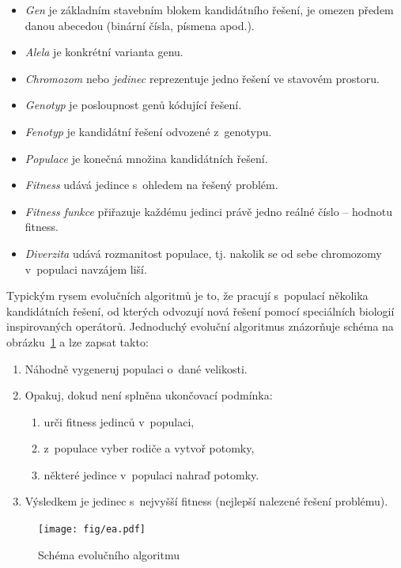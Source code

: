 \begin{itemize}
    \item\emph{Gen} je základním stavebním blokem kandidátního řešení, je omezen předem danou abecedou (binární čísla, písmena apod.).
    \item\emph{Alela} je konkrétní varianta genu.
    \item\emph{Chromozom} nebo \emph{jedinec} reprezentuje jedno řešení ve stavovém prostoru.
    \item\emph{Genotyp} je posloupnost genů kódující řešení.
    \item\emph{Fenotyp} je kandidátní řešení odvozené z~genotypu.
    \item\emph{Populace} je konečná množina kandidátních řešení.
    \item\emph{Fitness} udává  jedince s~ohledem na řešený problém.
    \item\emph{Fitness funkce} přiřazuje každému jedinci právě jedno reálné číslo -- hodnotu fitness.
    \item\emph{Diverzita} udává rozmanitost populace, tj. nakolik se od sebe chromozomy v~populaci navzájem liší.
\end{itemize}

Typickým rysem evolučních algoritmů je to, že pracují s~populací několika kandidátních řešení, od kterých odvozují nová řešení pomocí speciálních biologií inspirovaných operátorů. Jednoduchý evoluční algoritmus znázorňuje schéma na obrázku~\ref{obrEA} a lze zapsat takto:

\begin{enumerate}
    \item Náhodně vygeneruj populaci o~dané velikosti.
    \item Opakuj, dokud není splněna ukončovací podmínka:
    \begin{enumerate}
        \item urči fitness jedinců v~populaci,
        \item z~populace vyber rodiče a vytvoř potomky,
        \item některé jedince v~populaci nahraď potomky.
    \end{enumerate}
    \item Výsledkem je jedinec s~nejvyšší fitness (nejlepší nalezené řešení problému).
\end{enumerate}

\begin{figure}[htb]
    \centering\texttt{[image: fig/ea.pdf]}
    \caption{Schéma evolučního algoritmu}
    \label{obrEA}
\end{figure}

